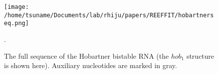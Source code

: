 \documentclass[12pt]{article}
\begin{document}
\begin{figure}[here]
\texttt{[image: /home/tsuname/Documents/lab/rhiju/papers/REEFFIT/hobartnerseq.png]}
\caption{The full sequence of the Hobartner bistable RNA (the $hob_1$ structure is shown here). Auxiliary nucleotides are marked in gray.}.
\label{fig:hobartnerseq}
\end{figure}
\end{document}

